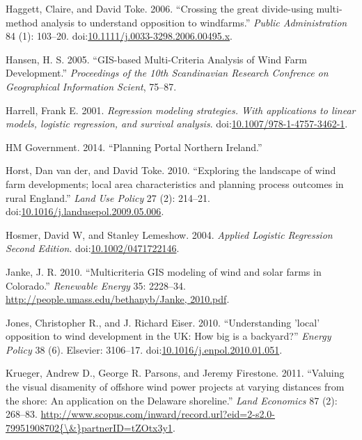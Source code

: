 \documentclass[a4paper,]{article}
\theoremstyle{definition}
\theoremstyle{definition}
\theoremstyle{remark}
\begin{document}
{\hypertarget{ref-Haggett2006}{}
Haggett, Claire, and David Toke. 2006. ``Crossing the great divide-using
multi-method analysis to understand opposition to windfarms.''
\emph{Public Administration} 84 (1): 103--20.
doi:\href{https://doi.org/10.1111/j.0033-3298.2006.00495.x}{10.1111/j.0033-3298.2006.00495.x}.

\hypertarget{ref-Hansen2005}{}
Hansen, H. S. 2005. ``GIS-based Multi-Criteria Analysis of Wind Farm
Development.'' \emph{Proceedings of the 10th Scandinavian Research
Confrence on Geographical Information Scient}, 75--87.

\hypertarget{ref-Harrell2001}{}
Harrell, Frank E. 2001. \emph{Regression modeling strategies. With
applications to linear models, logistic regression, and survival
analysis}.
doi:\href{https://doi.org/10.1007/978-1-4757-3462-1}{10.1007/978-1-4757-3462-1}.

\hypertarget{ref-HMGovernment2014}{}
HM Government. 2014. ``Planning Portal Northern Ireland.''

\hypertarget{ref-VanderHorst2010}{}
Horst, Dan van der, and David Toke. 2010. ``Exploring the landscape of
wind farm developments; local area characteristics and planning process
outcomes in rural England.'' \emph{Land Use Policy} 27 (2): 214--21.
doi:\href{https://doi.org/10.1016/j.landusepol.2009.05.006}{10.1016/j.landusepol.2009.05.006}.

\hypertarget{ref-Hosmer2004}{}
Hosmer, David W, and Stanley Lemeshow. 2004. \emph{Applied Logistic
Regression Second Edition}.
doi:\href{https://doi.org/10.1002/0471722146}{10.1002/0471722146}.

\hypertarget{ref-Janke2010}{}
Janke, J. R. 2010. ``Multicriteria GIS modeling of wind and solar farms
in Colorado.'' \emph{Renewable Energy} 35: 2228--34.
\href{http://people.umass.edu/bethanyb/Janke,\%202010.pdf}{http://people.umass.edu/bethanyb/Janke, 2010.pdf}.

\hypertarget{ref-Jones2010a}{}
Jones, Christopher R., and J. Richard Eiser. 2010. ``Understanding
'local' opposition to wind development in the UK: How big is a
backyard?'' \emph{Energy Policy} 38 (6). Elsevier: 3106--17.
doi:\href{https://doi.org/10.1016/j.enpol.2010.01.051}{10.1016/j.enpol.2010.01.051}.

\hypertarget{ref-Krueger2011}{}
Krueger, Andrew D., George R. Parsons, and Jeremy Firestone. 2011.
``Valuing the visual disamenity of offshore wind power projects at
varying distances from the shore: An application on the Delaware
shoreline.'' \emph{Land Economics} 87 (2): 268--83.
\href{http://www.scopus.com/inward/record.url?eid=2-s2.0-79951908702\%7B/\&\%7DpartnerID=tZOtx3y1}{http://www.scopus.com/inward/record.url?eid=2-s2.0-79951908702\{\textbackslash{}\&\}partnerID=tZOtx3y1}.

}
\end{document}
